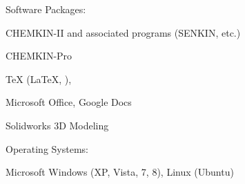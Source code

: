 Software Packages:
%
\begin{innerlist}
    \item CHEMKIN-II and associated programs (SENKIN, etc.)
    \item CHEMKIN-Pro
    \item \TeX{} (\LaTeX{}, \BibTeX{}),
    \item Microsoft Office, Google Docs
    \item Solidworks 3D Modeling
\end{innerlist}

\halfblankline

Operating Systems:
%
\begin{innerlist}
    \item Microsoft Windows (XP, Vista, 7, 8), Linux (Ubuntu)
\end{innerlist}





